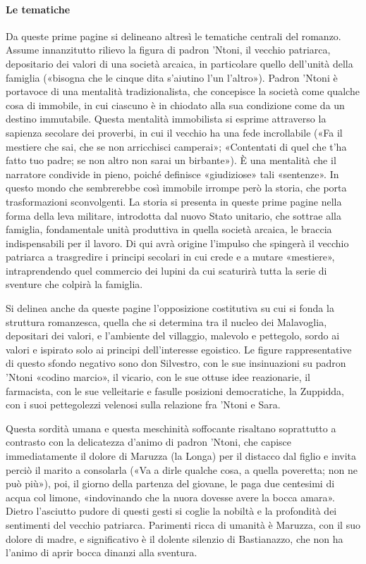 \documentclass{book}
\newcounter{mar}
\begin{document}
\paragraph{Le tematiche} Da queste prime pagine si delineano altresì le tematiche centrali del romanzo. Assume innanzitutto rilievo la figura di padron 'Ntoni, il vecchio patriarca, depositario dei valori di una società arcaica, in particolare quello dell'unità della famiglia («bisogna che le cinque dita s'aiutino l'un l'altro»). Padron 'Ntoni è portavoce di una mentalità tradizionalista, che concepisce la società come qualche cosa di immobile, in cui ciascuno è in chiodato alla sua condizione come da un destino immutabile. Questa mentalità immobilista si esprime attraverso la sapienza secolare dei proverbi, in cui il vecchio ha una fede incrollabile («Fa il mestiere che sai, che se non arricchisci camperai»; «Contentati di quel che t'ha fatto tuo padre; se non altro non sarai un birbante»). È una mentalità che il narratore condivide in pieno, poiché definisce «giudiziose» tali «sentenze». In questo mondo che sembrerebbe così immobile irrompe però la storia, che porta trasformazioni sconvolgenti. La storia si presenta in queste prime pagine nella forma della leva militare, introdotta dal nuovo Stato unitario, che sottrae alla famiglia, fondamentale unità produttiva in quella società arcaica, le braccia indispensabili per il lavoro. Di qui avrà origine l'impulso che spingerà il vecchio patriarca a trasgredire i principi secolari in cui crede e a mutare «mestiere», intraprendendo quel commercio dei lupini da cui scaturirà tutta la serie di sventure che colpirà la famiglia.

Si delinea anche da queste pagine l'opposizione costitutiva su cui si fonda la struttura romanzesca, quella che si determina tra il nucleo dei Malavoglia, depositari dei valori, e l'ambiente del villaggio, malevolo e pettegolo, sordo ai valori e ispirato solo ai principi dell'interesse egoistico. Le figure rappresentative di questo sfondo negativo sono don Silvestro, con le sue insinuazioni su padron 'Ntoni «codino marcio», il vicario, con le sue ottuse idee reazionarie, il farmacista, con le sue velleitarie e fasulle posizioni democratiche, la Zuppidda, con i suoi pettegolezzi velenosi sulla relazione fra ’Ntoni e Sara.

Questa sordità umana e questa meschinità soffocante risaltano soprattutto a contrasto con la delicatezza d'animo di padron 'Ntoni, che capisce immediatamente il dolore di Maruzza (la Longa) per il distacco dal figlio e invita perciò il marito a consolarla («Va a dirle qualche cosa, a quella poveretta; non ne può più»), poi, il giorno della partenza del giovane, le paga due centesimi di acqua col limone, «indovinando che la nuora dovesse avere la bocca amara». Dietro l'asciutto pudore di questi gesti si coglie la nobiltà e la profondità dei sentimenti del vecchio patriarca. Parimenti ricca di umanità è Maruzza, con il suo dolore di madre, e significativo è il dolente silenzio di Bastianazzo, che non ha l'animo di aprir bocca dinanzi alla sventura.
\end{document}
